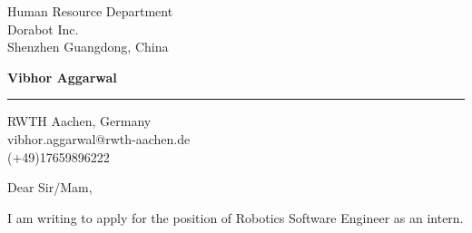 \documentclass{letter} %
\date{24th September, 2019 } %
\begin{document}
\signature{Vibhor Aggarwal}           %
\longindentation=0pt                       %
\let\raggedleft\raggedright                %
 
 
\begin{letter}
{Human Resource Department\\
Dorabot Inc.\\
Shenzhen Guangdong, China}
\begin{center}
{\large\bf Vibhor Aggarwal} 
\end{center}
\medskip\hrule height 1pt
\begin{center}
{RWTH Aachen, Germany  \\  vibhor.aggarwal@rwth-aachen.de \\ (+49)17659896222 } 
\end{center} \vfill %
 
 
\opening{Dear Sir/Mam,} 
I am writing to apply for the position of Robotics Software Engineer as an intern.


\end{letter}
\end{document}
